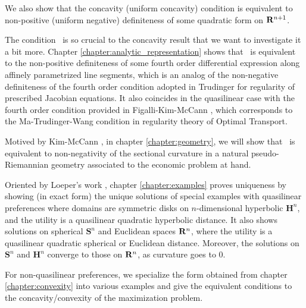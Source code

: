 We also show that the concavity (uniform concavity) condition is equivalent to non-positive (uniform negative) definiteness of some quadratic form on ${\mathbf R}^{n+1}$. \medskip

The condition \Gthree~is so crucial to the concavity result that we want to investigate it a bit more. Chapter \ref{chapter:analytic_representation} shows that \Gthree~is equivalent to the non-positive definiteness of some fourth order differential expression along affinely parametrized line segments, which is an analog of the non-negative definiteness of the fourth order condition adopted in Trudinger \cite{Trudinger14} for regularity of prescribed Jacobian equations. It also coincides in the quasilinear case with the fourth order condition provided in Figalli-Kim-McCann \cite{FigalliKimMcCann11}, which corresponds to the Ma-Trudinger-Wang condition \cite{MaTrudingerWang05} in regularity theory of Optimal Transport.\medskip

Motived by Kim-McCann \cite{KimMcCann10}, in chapter \ref{chapter:geometry}, we will show that \Gthree~is equivalent to non-negativity of the sectional curvature in a natural pseudo-Riemannian geometry associated to the economic problem at hand.\medskip




Oriented by Loeper's work \cite{Loeper09}, chapter \ref{chapter:examples} proves uniqueness by showing (in exact form) the unique solutions of special examples with quasilinear preferences where domains are symmetric disks on $n$-dimensional hyperbolic $\mathbf{H}^n$, and the utility is a quasilinear quadratic hyperbolic distance. It also shows solutions on spherical $\mathbf{S}^n$ and Euclidean spaces ${\mathbf R}^n$, where the utility is a quasilinear quadratic spherical or Euclidean distance. Moreover, the solutions on $\mathbf{S}^n$ and $\mathbf{H}^n$ converge to those on ${\mathbf R}^n$, as curvature goes to $0$.
\medskip






For non-quasilinear preferences, we specialize the form obtained from chapter \ref{chapter:convexity} into various examples  and give the equivalent conditions to the concavity/convexity of the maximization problem.\medskip


